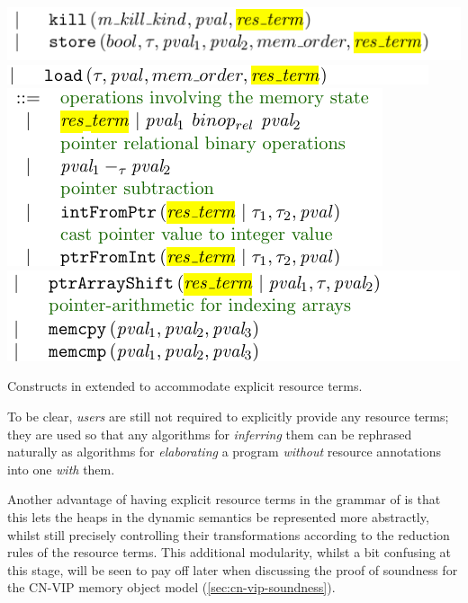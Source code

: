 \begin{marginfigure}
    \centering
    \includegraphics{figures/kernel-res-term-1}
    \includegraphics{figures/kernel-res-term-2}
    \includegraphics{figures/kernel-res-term-3}
    \includegraphics{figures/kernel-res-term-4}
    \caption{Constructs in  extended to accommodate
    explicit resource terms.}\label{fig:res-term-constructs}
\end{marginfigure}

To be clear,  \emph{users} are still not required to explicitly provide
any resource terms; they are used so that any algorithms for \emph{inferring}
them can be rephrased naturally as algorithms for \emph{elaborating} a program
\emph{without} resource annotations into one \emph{with} them.

Another advantage of having explicit resource terms in the grammar of
 is that this lets the heaps in the dynamic semantics be
represented more abstractly, whilst still precisely controlling their
transformations according to the reduction rules of the resource terms. This
additional modularity, whilst a bit confusing at this stage, will be seen to
pay off later when discussing the proof of soundness for the CN-VIP memory
object model (\cref{sec:cn-vip-soundness}).

